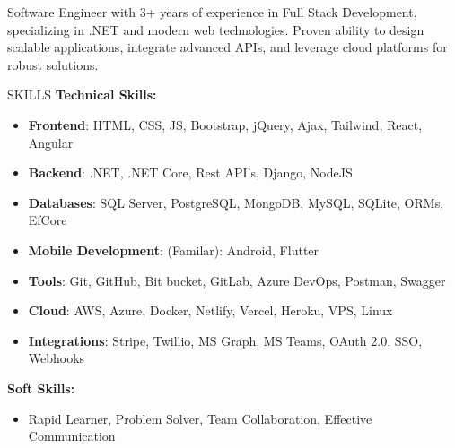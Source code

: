 \documentclass{resume} %
\begin{document}

\begin{rSection}%

{Software Engineer with 3+ years of experience in Full Stack Development, specializing in .NET and modern web technologies. Proven ability to design scalable applications, integrate advanced APIs, and leverage cloud platforms for robust solutions. %
}


\end{rSection}


\begin{rSection}{SKILLS}
\textbf{Technical Skills:}
\begin{itemize}
	\item \textbf{Frontend}: HTML, CSS, JS, Bootstrap, jQuery, Ajax, Tailwind, React, Angular
	\item \textbf{Backend}:  .NET, .NET Core, Rest API's, Django, NodeJS
	\item \textbf{Databases}: SQL Server, PostgreSQL, MongoDB, MySQL, SQLite, ORMs, EfCore
	\item \textbf{Mobile Development}: (Familar): Android, Flutter
	\item \textbf{Tools}: Git, GitHub, Bit bucket, GitLab, Azure DevOps, Postman, Swagger
	\item \textbf{Cloud}: AWS, Azure, Docker, Netlify, Vercel, Heroku, VPS, Linux
	\item \textbf{Integrations}: Stripe, Twillio, MS Graph, MS Teams, OAuth 2.0, SSO, Webhooks
	
\end{itemize}


\textbf{Soft Skills:} 
\begin{itemize}
\item Rapid Learner, Problem Solver, Team Collaboration, Effective Communication
\end{itemize}


\end{rSection}
\end{document}
